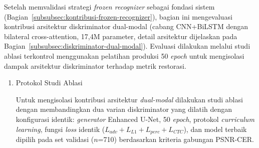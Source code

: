 Setelah memvalidasi strategi \textit{frozen recognizer} sebagai fondasi sistem (Bagian~\ref{subsubsec:kontribusi-frozen-recognizer}), bagian ini mengevaluasi kontribusi arsitektur diskriminator dual-modal (cabang CNN+BiLSTM dengan bilateral cross-attention, 17,4M parameter, detail arsitektur dijelaskan pada Bagian~\ref{subsubsec:diskriminator-dual-modal}). Evaluasi dilakukan melalui studi ablasi terkontrol menggunakan pelatihan produksi 50 \textit{epoch} untuk mengisolasi dampak arsitektur diskriminator terhadap metrik restorasi.



\begin{enumerate}[leftmargin=1.5em, labelsep=0.5em, itemindent=0pt, noitemsep, topsep=0pt]
    \item Protokol Studi Ablasi

          Untuk mengisolasi kontribusi arsitektur \textit{dual-modal} dilakukan studi ablasi dengan membandingkan dua varian diskriminator yang dilatih dengan konfigurasi identik: \textit{generator} Enhanced U-Net, 50 \textit{epoch}, protokol \textit{curriculum learning}, fungsi \textit{loss} identik ($L_{adv} + L_{L1} + L_{perc} + L_{CTC}$), dan model terbaik dipilih pada set validasi ($n$=710) berdasarkan kriteria gabungan PSNR-CER.


\end{enumerate}
